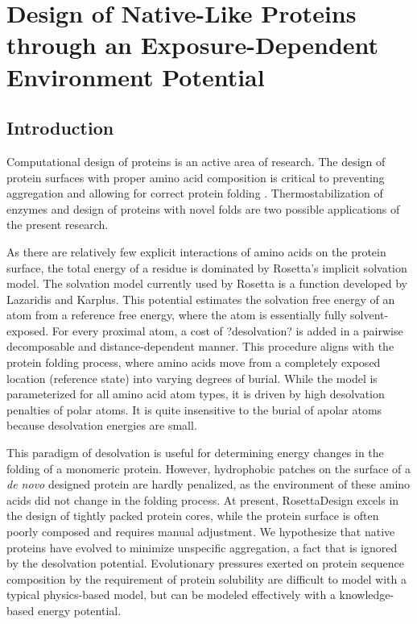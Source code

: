 \chapter{Design of Native-Like Proteins through an Exposure-Dependent Environment Potential}
\label{chap:nv_kbp}
\section{Introduction}
Computational design of proteins is an active area of research.
The design of protein surfaces with proper amino acid composition is critical to preventing aggregation and allowing for correct protein folding \citep{Chandler:2005ds}.
Thermostabilization of enzymes and design of proteins with novel folds are two possible applications of the present research. 

As there are relatively few explicit interactions of amino acids on the protein surface, the total energy of a residue is dominated by Rosetta's implicit solvation model.
The solvation model currently used by Rosetta is a function developed by Lazaridis and Karplus\citep{Lazaridis:1999wi}.
This potential estimates the solvation free energy of an atom from a reference free energy, where the atom is essentially fully solvent-exposed.
For every proximal atom, a cost of ?desolvation? is added in a pairwise decomposable and distance-dependent manner.
This procedure aligns with the protein folding process, where amino acids move from a completely exposed location (reference state) into varying degrees of burial.
While the model is parameterized for all amino acid atom types, it is driven by high desolvation penalties of polar atoms.
It is quite insensitive to the burial of apolar atoms because desolvation energies are small. 

This paradigm of desolvation is useful for determining energy changes in the folding of a monomeric protein.
However, hydrophobic patches on the surface of a {\em de novo} designed protein are hardly penalized, as the environment of these amino acids did not change in the folding process.
At present, RosettaDesign excels in the design of tightly packed protein cores, while the protein surface is often poorly composed and requires manual adjustment\citep{Dantas:2003vt}.
We hypothesize that native proteins have evolved to minimize unspecific aggregation, a fact that is ignored by the desolvation potential.
Evolutionary pressures exerted on protein sequence composition by the requirement of protein solubility are difficult to model with a typical physics-based model, but can be modeled effectively with a knowledge-based energy potential. 

